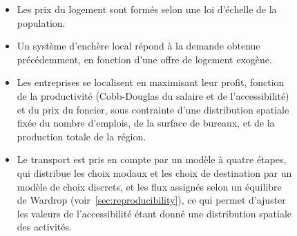 \begin{figure}
\begin{mdframed}
{\begin{itemize}
		\item Les prix du logement sont formés selon une loi d'échelle de la population.
		\item Un système d'enchère local répond à la demande obtenue précédemment, en fonction d'une offre de logement exogène.
		\item Les entreprises se localisent en maximisant leur profit, fonction de la productivité (Cobb-Douglas du salaire et de l'accessibilité) et du prix du foncier, sous contrainte d'une distribution spatiale fixée du nombre d'emplois, de la surface de bureaux, et de la production totale de la région.
		\item Le transport est pris en compte par un modèle à quatre étapes, qui distribue les choix modaux et les choix de destination par un modèle de choix discrets, et les flux assignés selon un équilibre de Wardrop (voir~\ref{sec:reproducibility}), ce qui permet d'ajuster les valeurs de l'accessibilité étant donné une distribution spatiale des activités.
	\end{itemize}
	}
	
	
	
	\bigskip
	

\end{mdframed}
\end{figure}
